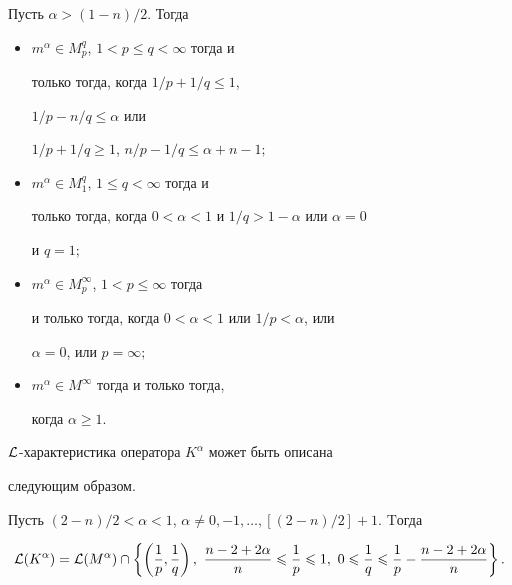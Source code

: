 \begin{thm}


Пусть $\alpha>(1-n)/2$. Тогда


\begin{itemize}


\item [1)] $m^\alpha\in M_p^q$, $1<p\leqslant q<\infty$ тогда и


только тогда, когда $1/p+1/q\leqslant 1$,


$1/p-n/q\leqslant \alpha$ или


$1/p+1/q\geqslant 1$, $n/p-1/q\leqslant \alpha+n-1;$


\item [2)] $m^\alpha\in M_1^q$, $1\leqslant q<\infty$ тогда и


только тогда, когда $0<\alpha<1$ и $1/q>1-\alpha$ или $\alpha=0$


и $q=1;$


\item [3)] $m^\alpha\in M_p^\infty$, $1<p\leqslant \infty$ тогда


и только тогда, когда $0<\alpha<1$ или $1/p<\alpha$, или


$\alpha=0$, или $p=\infty;$


\item [4)] $m^\alpha\in M^\infty$ тогда и только тогда,


когда $\alpha\geqslant 1$.


\end{itemize}


\end{thm}





$\cal L$-характеристика оператора $K^\alpha$ может быть описана


следующим образом.





\begin{thm}


Пусть $(2-n)/2<\alpha<1$, $\alpha\ne 0,-1,\dotsc,


\left[(2-n)/2\right]+1$. Tогда


$$


{\cal L}(K^\alpha)= {\cal L}(M^\alpha)\cap \left\{\left(\frac


1p, \frac1q\right),\ \frac{n-2+2\alpha}{n} \leqslant \frac


1p\leqslant 1,\ 0\leqslant \frac 1q \leqslant \frac 1p-


\frac{n-2+2\alpha}{n}\right\}.


$$


\end{thm}





